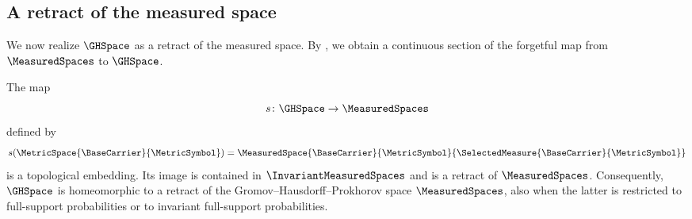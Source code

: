 \subsection{A retract of the measured space}\label{subsec:measures-retract}
We now realize
$\GHSpace$
as a retract of the measured space.
By ,
we obtain a continuous section of the forgetful map from
$\MeasuredSpaces$
to
$\GHSpace$.

\begin{corollary}\label{cor:ghp-retract}
The map
\[
 s\colon\GHSpace\to\MeasuredSpaces
\]
defined by
\[
 s(\MetricSpace{\BaseCarrier}{\MetricSymbol})
 =\MeasuredSpace{\BaseCarrier}{\MetricSymbol}
   {\SelectedMeasure{\BaseCarrier}{\MetricSymbol}}
\]
is a topological embedding.
Its image is contained in
$\InvariantMeasuredSpaces$
and is a retract of
$\MeasuredSpaces$.
Consequently,
$\GHSpace$
is homeomorphic to a retract of the Gromov--Hausdorff--Prokhorov space
$\MeasuredSpaces$,
also when the latter is restricted to full-support probabilities or to
invariant full-support probabilities.
\end{corollary}

